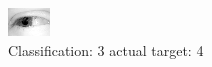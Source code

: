 \begin{figure}[h!]
\begin{center}
\includegraphics[width=0.60\columnwidth]{figures/ID2497_class_3_target_4.png}
\end{center}
\caption{ Classification: 3 actual target: 4}
\label{fig:ID2497_class_3_target_4}
\end{figure}
